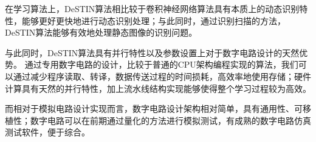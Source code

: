 在学习算法上，DeSTIN算法相比较于卷积神经网络算法具有本质上的动态识别特性，能够更好更快地进行动态识别处理；与此同时，通过识别扫描的方法，DeSTIN算法能够有效地处理静态图像的识别问题。

与此同时，DeSTIN算法具有并行特性以及参数设置上对于数字电路设计的天然优势。 通过专用数字电路的设计，比较于普通的CPU架构编程实现的算法，我们可以通过减少程序读取、转译，数据传送过程的时间损耗，高效率地使用存储；硬件计算具有天然的并行特性，加上流水线结构实现能够使得整个学习过程较为高效。 

而相对于模拟电路设计实现而言，数字电路设计架构相对简单，具有通用性、可移植性；数字电路可以在前期通过量化的方法进行模拟测试，有成熟的数字电路仿真测试软件，便于综合。

%